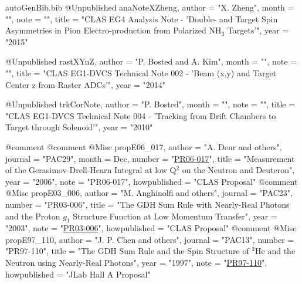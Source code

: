 \begin{filecontents*}{autoGenBib.bib}
@Unpublished{ anaNoteXZheng,
	author = "X. Zheng",
	month = "",
	note = "",
	title = "{CLAS EG4 Analysis Note - 'Double- and Target Spin Asymmetries in Pion Electro-production from Polarized NH$_3$ Targets'}",
	year = "2015"
}

@Unpublished{ rastXYnZ,
	author = "P. Bosted and A. Kim",
	month = "",
	note = "",
	title = "{CLAS EG1-DVCS Technical Note 002 - 'Beam (x,y) and Target Center z from Raster ADCs'}",
	year = "2014"
}

@Unpublished{ trkCorNote,
	author = "P. Bosted",
	month = "",
	note = "",
	title = "{CLAS EG1-DVCS Technical Note 004 - 'Tracking from Drift Chambers to Target through Solenoid'}",
	year = "2010"
}

@comment %
@comment %
@Misc{ propE06_017,
	author = "A. Deur and others",
	journal = "PAC29",
	month = Dec,
	number = "\href{http://www.jlab.org/exp_prog/proposals/06/PR06-017.pdf}{PR06-017}",
	title = "{Measurement of the Gerasimov-Drell-Hearn Integral at low Q$^{2}$ on the Neutron and Deuteron}",
	year = "2006",
	note = "PR06-017",
	howpublished = "CLAS Proposal"
}
@comment %
@Misc{ propE03_006,
	author = "{M. Anghinolfi and others}",
	journal = "PAC23",
	number = "PR03-006",
	title = "{The GDH Sum Rule with Nearly-Real Photons and the Proton $g_1$ Structure Function at Low Momentum Transfer}",
	year = "2003",
	note = "\href{http://www.jlab.org/exp_prog/proposals/03/PR03-006.pdf}{PR03-006}",
	howpublished = "CLAS Proposal"
}
@comment %
@Misc{ propE97_110,
	author = "{J. P. Chen and others}",
	journal = "PAC13",
	number = "PR97-110",
	title = "{The GDH Sum Rule and the Spin Structure of $^3$He and the Neutron using Nearly-Real Photons}",
	year = "1997",
	note = "\href{http://www.jlab.org/exp_prog/proposals/97/PR97-110.pdf}{PR97-110}",
	howpublished = "JLab Hall A Proposal"
}


\end{filecontents*}
